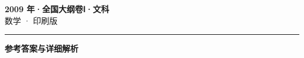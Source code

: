 \documentclass[zihao=5, a4paper]{ctexart}
\begin{document}
\begin{center}
  {\Large\bfseries 2009 年·全国大纲卷Ⅰ·文科}\\[4pt]
  {\large 数学 · 印刷版}
\end{center}
\medskip
{}

\par\bigskip\hrule\bigskip
{}
\begin{center}{\large\bfseries 参考答案与详细解析}\end{center}
\smallskip

\end{document}
